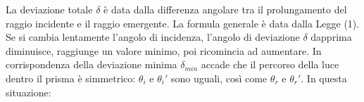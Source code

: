 La deviazione totale $\delta$ è data dalla differenza angolare tra il prolungamento del raggio incidente e il raggio emergente. La formula generale è data dalla Legge (1). Se si cambia lentamente l'angolo di incidenza, l'angolo di deviazione $\delta$ dapprima diminuisce, raggiunge un valore minimo, poi ricomincia ad aumentare. In corrispondenza della deviazione minima $\delta_{min}$ accade che il percorso della luce dentro il prisma è simmetrico: $\theta_i$ e $\theta_i'$ sono uguali, così come $\theta_r$ e $\theta_r'$. In questa situazione:
